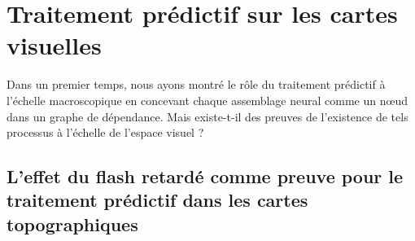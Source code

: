 \section{Traitement prédictif sur les cartes visuelles}
\label{sec:maps}
Dans un premier temps, nous ayons montré le rôle du traitement prédictif à l'échelle
macroscopique en concevant chaque assemblage neural comme un nœud dans
un graphe de dépendance. Mais existe-t-il des preuves de l'existence de tels
processus à l'échelle de l'espace visuel ?

\subsection{L'effet du flash retardé comme preuve pour le traitement
prédictif dans les cartes
topographiques}
